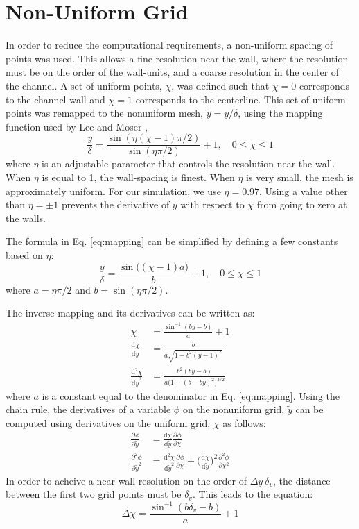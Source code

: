\documentclass[a4paper,11pt]{article}
\newcommand{\pderiv}[3][]{%
  \ensuremath{\frac{\partial^{#1} {#2}}{\partial {#3}^{#1}}}}
\begin{document}
\section{Non-Uniform Grid}
In order to reduce the computational requirements, a non-uniform spacing of points was used.  This allows a fine resolution near the wall, where the resolution must be on the order of the wall-units, and a coarse resolution in the center of the channel.  A set of uniform points, $\chi$, was defined such that $\chi=0$ corresponds to the channel wall and $\chi=1$ corresponds to the centerline.  This set of uniform points was remapped to the nonuniform mesh, $\tilde{y} = y/\delta$, using the mapping function used by Lee and Moser \cite{Lee},
\begin{equation} \label{eq:mapping}
 \frac{y}{\delta} = \frac{\sin(\eta (\chi-1) \pi/2)}{\sin(\eta \pi/2)}+1, \quad 0 \le \chi \le 1
\end{equation}
where $\eta$ is an adjustable parameter that controls the resolution near the wall. When $\eta$ is equal to 1, the wall-spacing is finest.  When $\eta$ is very small, the mesh is approximately uniform.  For our simulation, we use $\eta = 0.97$.  Using a value other than $\eta = \pm 1$ prevents the derivative of $y$ with respect to $\chi$ from going to zero at the walls.

The formula in Eq. \ref{eq:mapping} can be simplified by defining a few constants based on $\eta$:
\begin{equation}
 \frac{y}{\delta} = \frac{\sin\big((\chi-1)a\big)}{b}+1, \quad 0 \le \chi \le 1
\end{equation}
where $a = \eta \pi/2$ and $b = \sin (\eta \pi/2)$.

The inverse mapping and its derivatives can be written as:
\begin{align}
  \chi &= \frac{\sin^{-1}(by-b)}{a} + 1 \\
  \frac{\mathrm{d}\chi}{\mathrm{d}\tilde{y}} &= \frac{b}{a \sqrt{1-b^2(y-1)^2}} \label{eq:chi-y-1} \\
  \frac{\mathrm{d}^2\chi}{\mathrm{d}\tilde{y}^2} &= \frac{b^2(by-b)}{a\big(1-(b-by)^2\big)^{3/2}} \label{eq:chi-y-2}
\end{align}
where $a$ is a constant equal to the denominator in Eq. \ref{eq:mapping}.  Using the chain rule, the derivatives of a variable $\phi$ on the nonuniform grid, $\tilde{y}$ can be computed using derivatives on the uniform grid, $\chi$ as follows:
\begin{align}
 \pderiv{\phi}{\tilde{y}} &= \frac{\mathrm{d}\chi}{\mathrm{d}\tilde{y}} \pderiv{\phi}{\chi} \label{eq:phi-y-1} \\
 \pderiv[2]{\phi}{\tilde{y}} &= \frac{\mathrm{d}^2\chi}{\mathrm{d}\tilde{y}^2} \pderiv{\phi}{\chi} + \Big(\frac{\mathrm{d}\chi}{\mathrm{d}\tilde{y}} \Big)^2 \pderiv[2]{\phi}{\chi}  \label{eq:phi-y-2} 
\end{align}
In order to acheive a near-wall resolution on the order of $\Delta y ~ \delta_v$, the distance between the first two grid points must be $\delta_v$.  This leads to the equation:
\begin{equation}
 \Delta \chi = \frac{\sin^{-1}(b\delta_v -b)}{a}+1
\end{equation}
\end{document}
